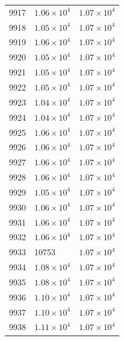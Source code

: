 \begin{table}[H]
\begin{tabular}{lll}
9917 & $\displaystyle 1.06 \times 10^{4}$ & $\displaystyle 1.07 \times 10^{4}$ \\
9918 & $\displaystyle 1.05 \times 10^{4}$ & $\displaystyle 1.07 \times 10^{4}$ \\
9919 & $\displaystyle 1.06 \times 10^{4}$ & $\displaystyle 1.07 \times 10^{4}$ \\
9920 & $\displaystyle 1.05 \times 10^{4}$ & $\displaystyle 1.07 \times 10^{4}$ \\
9921 & $\displaystyle 1.05 \times 10^{4}$ & $\displaystyle 1.07 \times 10^{4}$ \\
9922 & $\displaystyle 1.05 \times 10^{4}$ & $\displaystyle 1.07 \times 10^{4}$ \\
9923 & $\displaystyle 1.04 \times 10^{4}$ & $\displaystyle 1.07 \times 10^{4}$ \\
9924 & $\displaystyle 1.04 \times 10^{4}$ & $\displaystyle 1.07 \times 10^{4}$ \\
9925 & $\displaystyle 1.06 \times 10^{4}$ & $\displaystyle 1.07 \times 10^{4}$ \\
9926 & $\displaystyle 1.06 \times 10^{4}$ & $\displaystyle 1.07 \times 10^{4}$ \\
9927 & $\displaystyle 1.06 \times 10^{4}$ & $\displaystyle 1.07 \times 10^{4}$ \\
9928 & $\displaystyle 1.06 \times 10^{4}$ & $\displaystyle 1.07 \times 10^{4}$ \\
9929 & $\displaystyle 1.05 \times 10^{4}$ & $\displaystyle 1.07 \times 10^{4}$ \\
9930 & $\displaystyle 1.06 \times 10^{4}$ & $\displaystyle 1.07 \times 10^{4}$ \\
9931 & $\displaystyle 1.06 \times 10^{4}$ & $\displaystyle 1.07 \times 10^{4}$ \\
9932 & $\displaystyle 1.06 \times 10^{4}$ & $\displaystyle 1.07 \times 10^{4}$ \\
9933 & 10753 & $\displaystyle 1.07 \times 10^{4}$ \\
9934 & $\displaystyle 1.08 \times 10^{4}$ & $\displaystyle 1.07 \times 10^{4}$ \\
9935 & $\displaystyle 1.08 \times 10^{4}$ & $\displaystyle 1.07 \times 10^{4}$ \\
9936 & $\displaystyle 1.10 \times 10^{4}$ & $\displaystyle 1.07 \times 10^{4}$ \\
9937 & $\displaystyle 1.10 \times 10^{4}$ & $\displaystyle 1.07 \times 10^{4}$ \\
9938 & $\displaystyle 1.11 \times 10^{4}$ & $\displaystyle 1.07 \times 10^{4}$ \\

\end{tabular}
\end{table}
